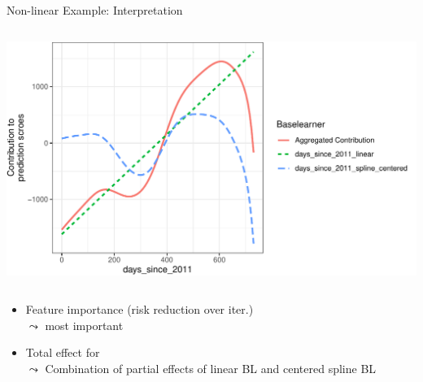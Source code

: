 \documentclass[10pt,compress,t,notes=noshow, xcolor=table]{beamer}
\begin{document}
\begin{frame}{Non-linear Example: Interpretation}
\begin{columns}[T, totalwidth = \textwidth]
{\begin{column}{0.5\linewidth}
  \includegraphics[width = \linewidth]{figure/compboost_pfe.pdf}
\end{column}
}
\end{columns}
\smallskip
\scriptsize
{}
\begin{itemize}
    \normalsize
    \item<2->  Feature importance (risk reduction over iter.) \\ $\leadsto$  most important
    \item<2-> Total effect for \\
$\leadsto$ Combination of partial effects of linear BL and centered spline BL
\end{itemize}
\end{frame}






\end{document}
